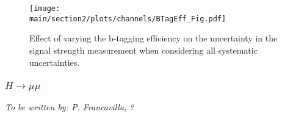 \begin{figure}[h!]
\begin{center}
\texttt{[image: \\main/section2/plots/channels/BTagEff\_Fig.pdf]}
\end{center}
\caption{Effect of varying the b-tagging efficiency on the uncertainty in the signal strength measurement when considering all systematic uncertainties.}
\label{fig:vhbb_btageff}
\end{figure}

\subsubsection{$H \to \mu\mu$}
{\it To be written by: P. Francavilla, ?}
